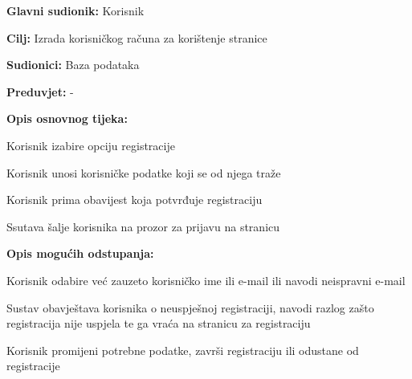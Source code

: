 					
					\noindent {}
					\begin{packed_item}
						\item \textbf{Glavni sudionik:} Korisnik
						\item  \textbf{Cilj:}  Izrada korisničkog računa za korištenje stranice
						\item  \textbf{Sudionici:} Baza podataka
						\item  \textbf{Preduvjet:} -
						\item  \textbf{Opis osnovnog tijeka:}
						
						\item[] \begin{packed_enum}
							
							\item Korisnik izabire opciju registracije
							\item Korisnik unosi korisničke podatke koji se od njega traže
							\item Korisnik prima obavijest koja potvrđuje registraciju
							\item Ssutava šalje korisnika na prozor za prijavu na stranicu
						\end{packed_enum}
						
						\item  \textbf{Opis mogućih odstupanja:}
						
						\item[] \begin{packed_item}
							
							\item[2.a] Korisnik odabire već zauzeto korisničko ime ili e-mail ili navodi neispravni e-mail
							\item[] \begin{packed_enum}
								
								\item Sustav obavještava korisnika o neuspješnoj registraciji, navodi razlog zašto
								registracija nije uspjela te ga vraća na stranicu za registraciju
								\item Korisnik promijeni potrebne podatke, završi registraciju ili odustane od registracije
								
							\end{packed_enum}
						\end{packed_item}
					\end{packed_item}
					
